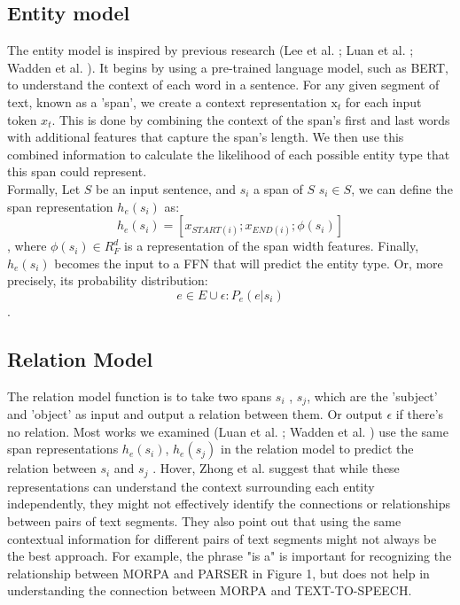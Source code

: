 \subsection{Entity model}
\label{sec:entitymodel}
The entity model is inspired by previous research (Lee et al. \cite{lee-etal-2017-end}; Luan et al. \cite{luan-etal-2019-general}; Wadden et al. \cite{Wadden2019EntityRA}). It begins by using a pre-trained language model, such as BERT, to understand the context of each word in a sentence. For any given segment of text, known as a 'span', we create a context representation \(\text{x}_t\) for each input token \(x_t\). This is done by combining the context of the span's first and last words with additional features that capture the span's length. We then use this combined information to calculate the likelihood of each possible entity type that this span could represent.\\
Formally, Let \(S\) be an input sentence, and \(s_i\) a span of \(S\)  \(s_i \in S\), we can define the span representation \(h_e(s_i)\) as\cite{Zhong2020AFE}: \[h_e(s_i) = [x_{START(i)} ; x_{END(i)} ; \phi(s_i)]\], where \(\phi(s_i) \in R^d_F\) is a representation of the span width features. Finally, \(h_e(s_i)\) becomes the input to a \ac{FFN} that will predict the entity type. Or, more precisely, its probability distribution: \[e \in E \cup {\epsilon}: P_e(e | s_i)\].

\subsection{Relation Model}
\label{sec:relationmodel}
The relation model function is to take two spans \(s_i\) , \(s_j\), which are the 'subject' and 'object' as input and output a relation between them. Or output \(\epsilon\) if there's no relation. Most works we examined (Luan et al. \cite{luan-etal-2019-general}; Wadden et al. \cite{Wadden2019EntityRA}) use the same span representations \(h_e(s_i)\), \(h_e(s_j)\) in the relation model to predict the relation between \(s_i\) and \(s_j\) . Hover, Zhong et al. \cite{Zhong2020AFE} suggest that while these representations can understand the context surrounding each entity independently, they might not effectively identify the connections or relationships between pairs of text segments. They also point out that using the same contextual information for different pairs of text segments might not always be the best approach. For example, the phrase "is a" is important for recognizing the relationship between MORPA and PARSER in Figure 1, but does not help in understanding the connection between MORPA and TEXT-TO-SPEECH.

